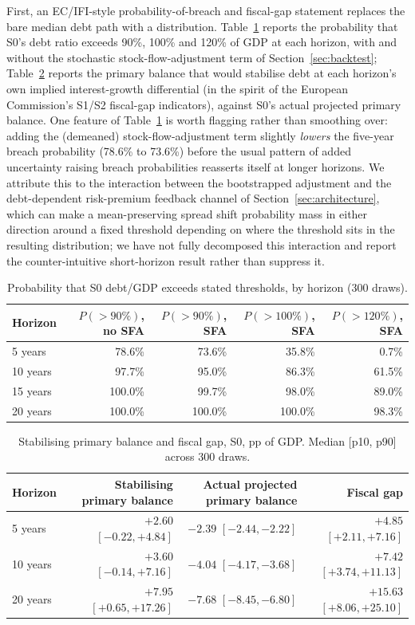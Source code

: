 \documentclass[11pt,a4paper]{article}
\begin{document}
First, an EC/IFI-style probability-of-breach and fiscal-gap statement replaces the bare median debt path with a distribution. Table~\ref{tab:d4breach} reports the probability that \textsc{S0}'s debt ratio exceeds 90\%, 100\% and 120\% of GDP at each horizon, with and without the stochastic stock-flow-adjustment term of Section~\ref{sec:backtest}; Table~\ref{tab:d4gap} reports the primary balance that would stabilise debt at each horizon's own implied interest-growth differential (in the spirit of the European Commission's S1/S2 fiscal-gap indicators), against \textsc{S0}'s actual projected primary balance. One feature of Table~\ref{tab:d4breach} is worth flagging rather than smoothing over: adding the (demeaned) stock-flow-adjustment term slightly \emph{lowers} the five-year breach probability (78.6\% to 73.6\%) before the usual pattern of added uncertainty raising breach probabilities reasserts itself at longer horizons. We attribute this to the interaction between the bootstrapped adjustment and the debt-dependent risk-premium feedback channel of Section~\ref{sec:architecture}, which can make a mean-preserving spread shift probability mass in either direction around a fixed threshold depending on where the threshold sits in the resulting distribution; we have not fully decomposed this interaction and report the counter-intuitive short-horizon result rather than suppress it.

\begin{table}[htbp]
\centering\small
\caption{Probability that \textsc{S0} debt/GDP exceeds stated thresholds, by horizon (300 draws).}
\label{tab:d4breach}
\begin{tabular}{lrrrr}
\toprule
Horizon & $P(>90\%)$, no SFA & $P(>90\%)$, SFA & $P(>100\%)$, SFA & $P(>120\%)$, SFA \\
\midrule
5 years & 78.6\% & 73.6\% & 35.8\% & 0.7\% \\
10 years & 97.7\% & 95.0\% & 86.3\% & 61.5\% \\
15 years & 100.0\% & 99.7\% & 98.0\% & 89.0\% \\
20 years & 100.0\% & 100.0\% & 100.0\% & 98.3\% \\
\bottomrule
\end{tabular}
\end{table}

\begin{table}[htbp]
\centering\small
\caption{Stabilising primary balance and fiscal gap, \textsc{S0}, pp of GDP. Median [p10, p90] across 300 draws.}
\label{tab:d4gap}
\begin{tabular}{lrrr}
\toprule
Horizon & Stabilising primary balance & Actual projected primary balance & Fiscal gap \\
\midrule
5 years & $+2.60$ $[-0.22,+4.84]$ & $-2.39$ $[-2.44,-2.22]$ & $+4.85$ $[+2.11,+7.16]$ \\
10 years & $+3.60$ $[-0.14,+7.16]$ & $-4.04$ $[-4.17,-3.68]$ & $+7.42$ $[+3.74,+11.13]$ \\
20 years & $+7.95$ $[+0.65,+17.26]$ & $-7.68$ $[-8.45,-6.80]$ & $+15.63$ $[+8.06,+25.10]$ \\
\bottomrule
\end{tabular}
\end{table}
\end{document}
